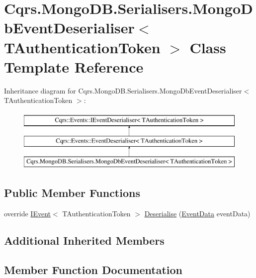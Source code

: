 \hypertarget{classCqrs_1_1MongoDB_1_1Serialisers_1_1MongoDbEventDeserialiser}{}\section{Cqrs.\+Mongo\+D\+B.\+Serialisers.\+Mongo\+Db\+Event\+Deserialiser$<$ T\+Authentication\+Token $>$ Class Template Reference}
\label{classCqrs_1_1MongoDB_1_1Serialisers_1_1MongoDbEventDeserialiser}
Inheritance diagram for Cqrs.\+Mongo\+D\+B.\+Serialisers.\+Mongo\+Db\+Event\+Deserialiser$<$ T\+Authentication\+Token $>$\+:\begin{figure}[H]
\begin{center}
\leavevmode
\includegraphics[height=3.000000cm]{classCqrs_1_1MongoDB_1_1Serialisers_1_1MongoDbEventDeserialiser}
\end{center}
\end{figure}
\subsection*{Public Member Functions}
\begin{DoxyCompactItemize}
\item 
override \hyperlink{interfaceCqrs_1_1Events_1_1IEvent}{I\+Event}$<$ T\+Authentication\+Token $>$ \hyperlink{classCqrs_1_1MongoDB_1_1Serialisers_1_1MongoDbEventDeserialiser_a2ea63367d97bf66e3dffcabb8c53005e}{Deserialise} (\hyperlink{classCqrs_1_1Events_1_1EventData}{Event\+Data} event\+Data)
\end{DoxyCompactItemize}
\subsection*{Additional Inherited Members}


\subsection{Member Function Documentation}
\mbox{\label{classCqrs_1_1MongoDB_1_1Serialisers_1_1MongoDbEventDeserialiser_a2ea63367d97bf66e3dffcabb8c53005e}} 
